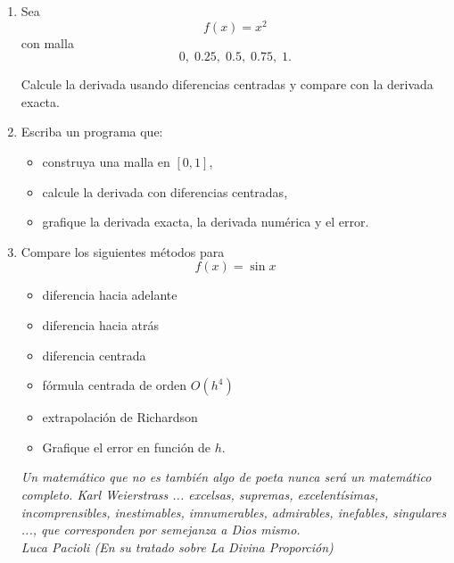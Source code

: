 \documentclass[11pt]{article}
\begin{document}
\begin{enumerate}
\item Sea
\[
f(x)=x^2
\]
con malla
\[
0,\;0.25,\;0.5,\;0.75,\;1.
\]

Calcule la derivada usando diferencias centradas y compare con la derivada exacta.

\item Escriba un programa que:
\begin{itemize}
\item construya una malla en $[0,1]$,
\item calcule la derivada con diferencias centradas,
\item grafique la derivada exacta, la derivada numérica y el error.
\end{itemize}


\item Compare los siguientes métodos para
\[
f(x)=\sin x
\]

\begin{itemize}
\item diferencia hacia adelante
\item diferencia hacia atrás
\item diferencia centrada
\item fórmula centrada de orden $O(h^4)$
\item extrapolación de Richardson
\item Grafique el error en función de $h$.
\end{itemize}

\it{Un matemático que no es también algo de poeta nunca será un matemático completo. Karl Weierstrass
 ... excelsas, supremas, excelentísimas, incomprensibles, inestimables, imnumerables, admirables, inefables, singulares ..., que corresponden por semejanza a Dios mismo.} \\

Luca Pacioli (En su tratado sobre La Divina Proporción)

\end{enumerate}
\end{document}
